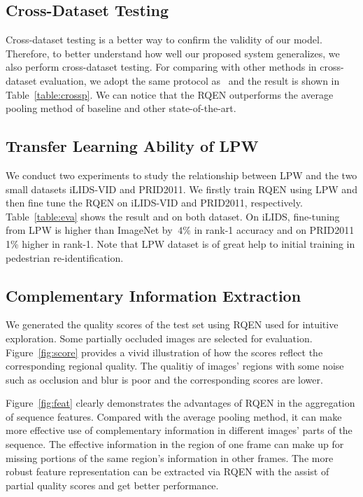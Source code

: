 \documentclass[letterpaper]{article} %
\begin{document}
\subsection{Cross-Dataset Testing}


 Cross-dataset testing is a better way to confirm the validity of our model. Therefore, to better understand how well our proposed system generalizes, we also perform cross-dataset testing.
 For comparing with other methods in cross-dataset evaluation, we adopt the same protocol as~\cite{mclaughlin2016recurrent} and the result is shown in Table~\ref{table:crossp}. We can notice that the RQEN outperforms the average pooling method of baseline and other state-of-the-art.

 \subsection{Transfer Learning Ability of LPW}



We conduct two experiments to study the relationship between LPW and the two small datasets iLIDS-VID and PRID2011. We firstly train RQEN using LPW and then fine tune the RQEN on iLIDS-VID and PRID2011, respectively. Table~\ref{table:eva} shows the result and on both dataset. On iLIDS, fine-tuning from LPW is higher than ImageNet by $~4\%$ in rank-1 accuracy and on PRID2011 1\% higher in rank-1. Note that LPW dataset is of great help to initial training in pedestrian re-identification.

\subsection{Complementary Information Extraction}


We generated the quality scores of the test set using RQEN used for intuitive exploration.
Some partially occluded images are selected for evaluation. Figure~\ref{fig:score} provides a vivid illustration of how the scores reflect the corresponding regional quality.
The qualitiy of images' regions with some noise such as occlusion and blur is poor and the corresponding scores are lower.

Figure~\ref{fig:feat} clearly demonstrates the advantages of RQEN in the aggregation of sequence features. Compared with the average pooling method, it can make more effective use of complementary information in different images' parts of the sequence. The effective information in the region of one frame can make up for missing portions of the same region's information in other frames. The more robust feature representation can be extracted via RQEN with the assist of partial quality scores and get better performance.
\end{document}
